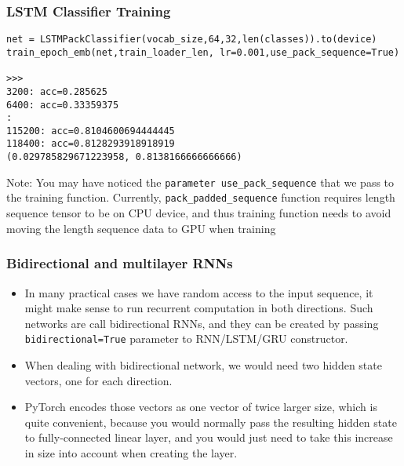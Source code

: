 \begin{frame}[fragile] \frametitle{LSTM Classifier Training}


\begin{lstlisting}
net = LSTMPackClassifier(vocab_size,64,32,len(classes)).to(device)
train_epoch_emb(net,train_loader_len, lr=0.001,use_pack_sequence=True)

>>>
3200: acc=0.285625
6400: acc=0.33359375
:
115200: acc=0.8104600694444445
118400: acc=0.8128293918918919
(0.029785829671223958, 0.8138166666666666)
\end{lstlisting}

Note: You may have noticed the \lstinline|parameter use_pack_sequence| that we pass to the training function. Currently, \lstinline|pack_padded_sequence| function requires length sequence tensor to be on CPU device, and thus training function needs to avoid moving the length sequence data to GPU when training

\end{frame}

\begin{frame}[fragile] \frametitle{Bidirectional and multilayer RNNs}

\begin{itemize}
\item In many practical cases we have random access to the input sequence, it might make sense to run recurrent computation in both directions. Such networks are call bidirectional RNNs, and they can be created by passing \lstinline|bidirectional=True| parameter to RNN/LSTM/GRU constructor.
\item When dealing with bidirectional network, we would need two hidden state vectors, one for each direction. 
\item PyTorch encodes those vectors as one vector of twice larger size, which is quite convenient, because you would normally pass the resulting hidden state to fully-connected linear layer, and you would just need to take this increase in size into account when creating the layer.
\end{itemize}
\end{frame}

